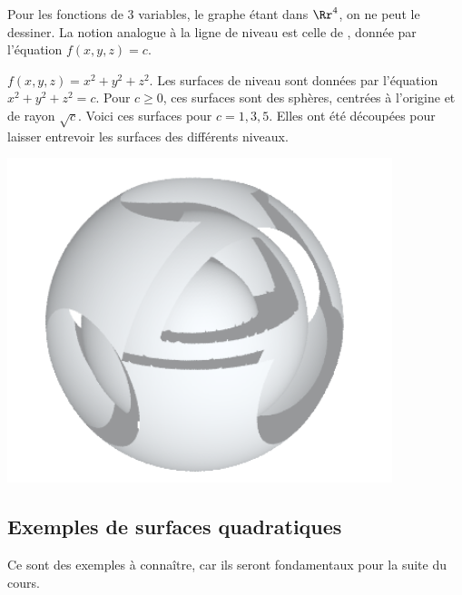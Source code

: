 \documentclass[11pt, class=report,crop=false]{standalone}
\begin{document}
 
 
\bigskip


Pour les fonctions de $3$ variables, le graphe étant dans $\Rr^4$, on ne peut le dessiner. 
La notion analogue à la ligne de niveau est celle de , donnée par l'équation $f(x,y,z)=c$.


\begin{exemple}
$f(x,y,z) = x^2+y^2+z^2$. Les surfaces de niveau sont données par l'équation $x^2+y^2+z^2=c$. 
Pour $c \ge 0$, ces surfaces sont des sphères, centrées à l'origine et de rayon $\sqrt{c}$. 
Voici ces surfaces pour $c=1,3,5$. Elles ont été découpées pour laisser entrevoir les surfaces des différents niveaux.

\begin{center}
    \includegraphics[scale=\myscale,scale=0.5]{figures/surface-niveau}
\end{center}

\end{exemple}



\subsection{Exemples de surfaces quadratiques}

Ce sont des exemples à connaître, car ils seront fondamentaux pour la suite du cours.
\end{document}
